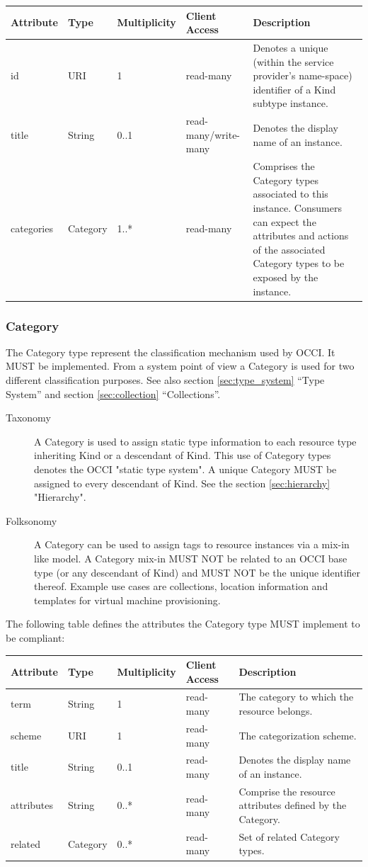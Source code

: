 \documentclass[10pt,a4paper]{article}
\begin{document}
\begin{tabular}{l|l|l|l|p{2.7in}}
Attribute & Type & Multiplicity & Client Access & Description \\
\hline
id & URI & 1 & read-many & Denotes a unique (within the service provider's name-space) identifier of a Kind subtype instance. \\
title & String & 0..1 & read-many/write-many & Denotes the display name of an instance. \\
categories & Category & 1..* & read-many & Comprises the Category types associated to this instance. Consumers can expect the attributes and actions of the associated Category types to be exposed by the instance. \\ 
\end{tabular}

\subsubsection{Category}
The Category type represent the classification mechanism used by OCCI. It MUST be implemented. From a system point of view a Category is used for two different classification purposes. See also section \ref{sec:type_system} ``Type System'' and section \ref{sec:collection} ``Collections''.

\begin{description}
\item[Taxonomy] A Category is used to assign static type information to each
resource type inheriting Kind or a descendant of Kind. This use of Category types
denotes the OCCI "static type system". A unique Category MUST be assigned to
every descendant of Kind. See the section \ref{sec:hierarchy} "Hierarchy".
\item[Folksonomy] A Category can be used to assign tags to resource instances
via a mix-in like model. A Category mix-in MUST NOT be related to an OCCI base
type (or any descendant of Kind) and MUST NOT be the unique identifier thereof.
Example use cases are collections, location information and templates for
virtual machine provisioning.
\end{description}

The following table defines the attributes the Category type MUST implement to be compliant:

\begin{tabular}{l|l|l|l|p{2.7in}}
Attribute & Type & Multiplicity & Client Access & Description \\
\hline
term & String & 1 & read-many & The category to which the resource belongs. \\
scheme & URI & 1 & read-many & The categorization scheme. \\
title & String & 0..1 & read-many & Denotes the display name of an instance. \\
attributes & String & 0..* & read-many & Comprise the resource attributes defined by the Category. \\
related & Category & 0..* & read-many & Set of related Category types. \\
\end{tabular}
\end{document}
